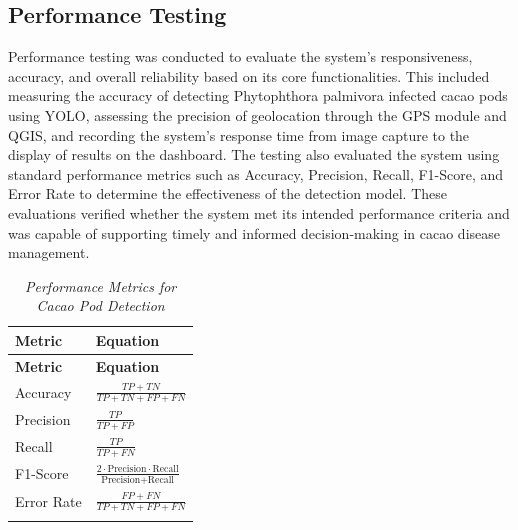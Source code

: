 \pagebreak

\subsection*{Performance Testing}

Performance testing was conducted to evaluate the system’s responsiveness, accuracy, and overall reliability based on its core functionalities. This included measuring the accuracy of detecting Phytophthora palmivora infected cacao pods using YOLO, assessing the precision of geolocation through the GPS module and QGIS, and recording the system’s response time from image capture to the display of results on the dashboard. The testing also evaluated the system using standard performance metrics such as Accuracy, Precision, Recall, F1-Score, and Error Rate to determine the effectiveness of the detection model. These evaluations verified whether the system met its intended performance criteria and was capable of supporting timely and informed decision-making in cacao disease management.

\begin{longtable}{p{4cm} >{\centering\arraybackslash}p{7cm}}
	\caption{\textit{Performance Metrics for Cacao Pod Detection}} \label{tab:metrics} \\
	
	\toprule
	\textbf{Metric} & \textbf{Equation} \\
	\midrule
	\endfirsthead
	
	\toprule
	\textbf{Metric} & \textbf{Equation} \\
	\midrule
	\endhead
	
	\bottomrule
	\endfoot
	
	Accuracy        &
	$\displaystyle \frac{TP + TN}{TP + TN + FP + FN}$ \\ \addlinespace \addlinespace
	
	Precision       &
	$\displaystyle \frac{TP}{TP + FP}$ \\ \addlinespace \addlinespace
	
	Recall          &
	$\displaystyle \frac{TP}{TP + FN}$ \\ \addlinespace \addlinespace
	
	F1-Score        &
	$\displaystyle \frac{2 \cdot \text{Precision} \cdot \text{Recall}}{\text{Precision} + \text{Recall}}$ \\ \addlinespace \addlinespace
	
	Error Rate      &
	$\displaystyle \frac{FP + FN}{TP + TN + FP + FN}$ \\ \addlinespace \addlinespace
\end{longtable}

